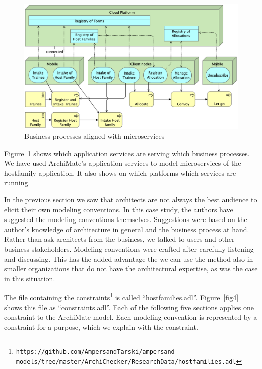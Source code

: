 \documentclass[sn-vancouver]{sn-jnl}%
\theoremstyle{thmstyleone}%
\theoremstyle{thmstyletwo}%
\theoremstyle{thmstylethree}%
\begin{document}
\begin{figure}[b]
 \centering
\includegraphics[clip=true, scale=0.07]{Services voor Uitvoering.png}
\caption{Business processes aligned with microservices}
\label{fig: Alignment of services with business processes}
\end{figure}

Figure~\ref{fig: Alignment of services with business processes} shows which application services are serving which business processes.
We have used ArchiMate's application services to model microservices of the hostfamily application.
It also shows on which platforms which services are running.

In the previous section we saw that architects are not always the best audience to elicit their own modeling conventions.
In this case study, the authors have suggested the modeling conventions themselves.
Suggestions were based on the author's knowledge of architecture in general and the business process at hand.
Rather than ask architects from the business, we talked to users and other business stakeholders.
Modeling conventions were crafted after carefully listening and discussing.
This has the added advantage the we can use the method also in smaller organizations that do not have the architectural expertise,
as was the case in this situation.

The file containing the constraints\footnote{\tt\tiny https://github.com/AmpersandTarski/ampersand-models/tree/master/ArchiChecker/ResearchData/hostfamilies.adl}
is called ``hostfamilies.adl''.
Figure~\ref{fig4} shows this file as ``constraints.adl''.
Each of the following five sections applies one constraint to the ArchiMate model.
Each modeling convention is represented by a constraint for a purpose,
which we explain with the constraint.
\end{document}
